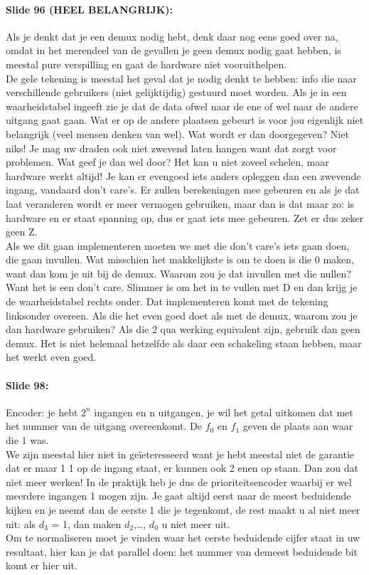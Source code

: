 \documentclass[10pt,a4paper]{book}
\begin{document}
\paragraph{Slide 96 (HEEL BELANGRIJK):} Als je denkt dat je een demux nodig hebt, denk daar nog eens goed over na, omdat in het merendeel van de gevallen je geen demux nodig gaat hebben, is meestal pure verspilling en gaat de hardware niet vooruithelpen.\\
De gele tekening is meestal het geval dat je nodig denkt te hebben: info die naar verschillende gebruikers (niet gelijktijdig) gestuurd moet worden. Als je in een waarheidstabel ingeeft zie je dat de data ofwel naar de ene of wel naar de andere uitgang gaat gaan. Wat er  op de andere plaatsen gebeurt is voor jou eigenlijk niet belangrijk (veel mensen denken van wel). Wat wordt er dan doorgegeven? Niet niks! Je mag uw draden ook niet zwevend laten hangen want dat zorgt voor problemen. Wat geef je dan wel door? Het kan u niet zoveel schelen, maar hardware werkt altijd! Je kan er evengoed iets anders opleggen dan een zwevende ingang, vandaard don't care's. Er zullen berekeningen mee gebeuren en als je dat laat veranderen wordt er meer vermogen gebruiken, maar dan is dat maar zo: is hardware en er staat spanning op, dus er gaat iets mee gebeuren. Zet er dus zeker geen Z.\\
Als we dit gaan implementeren moeten we met die don't care's iets gaan doen, die gaan invullen. Wat misschien het makkelijkste is om te doen is die 0 maken, want dan kom je uit bij de demux. Waarom zou je dat invullen met die nullen? Want het is een don't care. Slimmer is om het in te vullen met D en dan krijg je de waarheidstabel rechts onder. Dat implementeren komt met de tekening linksonder overeen. Als die het even goed doet als met de demux, waarom zou je dan hardware gebruiken? Als die 2 qua werking equivalent zijn, gebruik dan geen demux. Het is niet helemaal hetzelfde als daar een schakeling staan hebben, maar het werkt even goed.

\paragraph{Slide 98:} Encoder: je hebt $2^n$ ingangen en n uitgangen, je wil het getal uitkomen dat met het nummer van de uitgang overeenkomt. De $f_0$ en $f_1$ geven de plaats aan waar die 1 was.\\
We zijn meestal hier niet in ge\"ieteresseerd want je hebt meestal niet de garantie dat er maar 1 1 op de ingang staat, er kunnen ook 2 enen op staan. Dan zou dat niet meer werken! In de praktijk heb je dus de prioriteitsencoder waarbij er wel meerdere ingangen 1 mogen zijn. Je gaat altijd eerst naar de meest beduidende kijken en je neemt dan de eerste 1 die je tegenkomt, de rest maakt u al niet meer uit: als $d_3$ = 1, dan maken $d_2$,\ldots, $d_0$ u niet meer uit.\\
Om te normaliseren moet je vinden waar het eerste beduidende cijfer staat in uw resultaat, hier kan je dat parallel doen: het nummer van demeest beduidende bit komt er hier uit.
\end{document}
